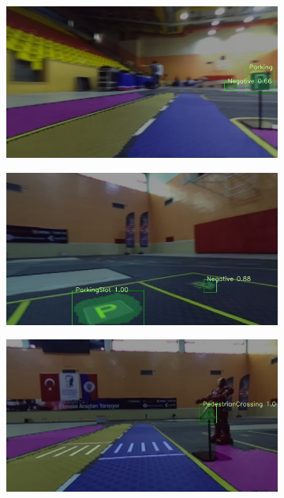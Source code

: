 \begin{figure}[h]
\begin{subfigure}[b]{0.45\linewidth}
  \end{subfigure}
  \begin{subfigure}[b]{0.45\linewidth}
    \includegraphics[width=\linewidth]{figures/experiments/real/parking.jpg}
  \end{subfigure}
  \begin{subfigure}[b]{0.45\linewidth}
    \includegraphics[width=\linewidth]{figures/experiments/real/parkingslot.jpg}
  \end{subfigure}
  \begin{subfigure}[b]{0.45\linewidth}
    \includegraphics[width=\linewidth]{figures/experiments/real/pedestrian-crossing.jpg}

\end{subfigure}
\end{figure}
